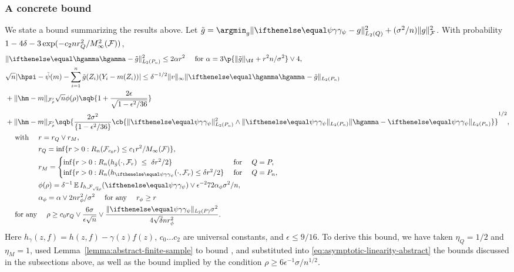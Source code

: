 \subsubsection{A concrete bound}
We state a bound summarizing the results above. Let
$\gapprox = \argmin_{g} \norm{\riesz[\psi] - g}_{L_2(Q)}^2 + (\sigma^2/n)\norm{g}_{\F}^2$. With probability $1-4\delta-3\exp(-c_2nr_Q^2/M_{\infty}^2(\mathcal{F}))$, 
\begin{equation}
\label{eq:asymptotic-linearity-concrete}
\begin{aligned}
&\norm{\hriesz - \gapprox}_{L_2(\Pn)}^2 \le 2\alpha r^2 \quad \text{ for } \alpha = 3\p{\norm{\gapprox}_{\ff} + r^2 n/\sigma^2} \vee 4, \\
&\sqrt{n}\abs{\hpsi - \tilde\psi(m) - \sum_{i=1}^n \gapprox(Z_i)(Y_i - m(Z_i))} \le \delta^{-1/2} \norm{v}_{\infty} \norm{\hriesz - \gapprox}_{L_2(\Pn)} \\
&+ \norm{\hm-m}_{\F'_{\rho}}\sqrt{n}\phi(\rho) \sqb{1+\frac{2\epsilon}{\sqrt{1-\epsilon^2/36}}}  \\
&+ \norm{\hm-m}_{\F'_{\rho}}\sqb{\frac{2\sigma^2}{\set{1-\epsilon^2/36}}\cb{\norm{\riesz[\psi]}_{L_2(\Pn)}^2 \wedge \norm{\riesz[\psi]}_{L_2(\Pn)}\norm{\hgamma-\riesz[\psi]}_{L_2(\Pn)}}}^{1/2}, \\
& \text{ \quad with \quad }            r = r_Q \vee r_M, \\
& \text{\hphantom{ \quad with \quad }} r_Q = \inf\set{ r > 0 : R_n(\F_{c_0r}) \le c_1 r^2/M_{\infty}(\F)}, \\
& \text{\hphantom{ \quad with \quad }} r_M = \begin{cases} \inf\set{ r > 0 : R_n(h_{\gapprox}(\cdot,\F_r)  \ \le \ \delta r^2/2} & \text{ for } \quad Q=\P,  \\
							   \inf\set{ r > 0 : R_n(h_{\riesz[\psi]}(\cdot,\F_r) \le \delta r^2/2} & \text{ for } \quad Q=\Pn, \end{cases}  \\
& \text{\hphantom{ \quad with \quad }} \phi(\rho) = \delta^{-1}\E I_{h,\F_{\sqrt{2}\rho}}(\riesz[\psi]) \vee \epsilon^{-2} 72 \alpha_{\phi} \sigma^2/n, \\
& \text{\hphantom{ \quad with \quad }} \alpha_{\phi} = \alpha \vee 2nr_{\phi}^2/\sigma^2 \quad \text{ for any } \quad r_{\phi} \ge r \\
& \text{ \quad for any \quad } \rho \ge c_0 r_Q \vee \frac{6 \sigma}{\epsilon \sqrt{n}} 
     \vee \frac{\norm{\riesz[\psi]}_{L_2(\P)} \sigma^2}{4\sqrt{\delta}n r_\phi^2}. 
\end{aligned}
\end{equation}
Here $h_{\gamma}(z,f) = h(z,f) - \gamma(z)f(z)$, $c_0 \ldots c_2$ are universal constants, and $\epsilon \le 9/16$.
To derive this bound, we have taken $\eta_Q=1/2$ and $\eta_M=1$, 
used Lemma~\ref{lemma:abstract-finite-sample} to bound ,
and substituted into \eqref{eq:asymptotic-linearity-abstract} the bounds discussed in the subsections above,
as well as the bound  implied by the condition $\rho \ge 6 \epsilon^{-1} \sigma / n^{1/2}$. 


